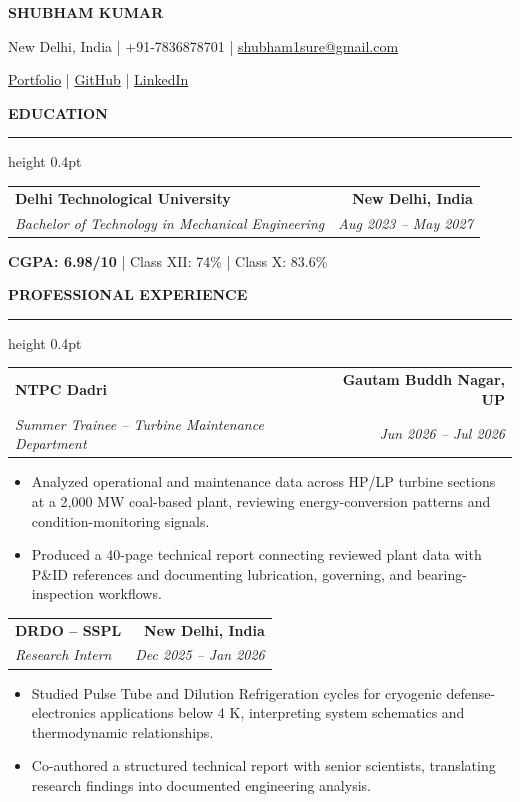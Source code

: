 \documentclass[10pt,a4paper]{article}
\makeatletter
\newcommand{\ressection}[1]{%
  \vspace{4.8pt}%
  {\fontsize{10.2}{11.2}\selectfont\bfseries\MakeUppercase{#1}}\par
  \vspace{2.3pt}\hrule height 0.4pt\vspace{3.6pt}%
}
\newcommand{\entryheading}[4]{%
  \begin{tabular*}{\textwidth}{@{\extracolsep{\fill}}lr}
    \textbf{#1} & \textbf{#2}\\
    \textit{#3} & \textit{#4}
  \end{tabular*}\par
}
\newenvironment{resbullets}{%
  \begin{itemize}[leftmargin=11pt,label=\textbullet,itemsep=0pt,topsep=1.2pt,parsep=0pt,partopsep=0pt]
  \fontsize{9.55}{10.95}\selectfont
}{\end{itemize}\vspace{1pt}}
\makeatother
\begin{document}
\fontsize{9.8}{11.2}\selectfont

\begin{center}
  {\fontsize{21.5}{23}\selectfont\bfseries SHUBHAM KUMAR}\par
  \vspace{1pt}
  New Delhi, India \quad | \quad +91-7836878701 \quad | \quad \href{mailto:shubham1sure@gmail.com}{shubham1sure@gmail.com}\par
  \vspace{1pt}
  \href{https://nothing0g.github.io/analyst/}{Portfolio} \quad | \quad
  \href{https://github.com/Nothing0g}{GitHub} \quad | \quad
  \href{https://www.linkedin.com/in/shubham-kumar-diff/}{LinkedIn}
\end{center}
\vspace{-3pt}

\ressection{Education}
\begin{tabular*}{\textwidth}{@{\extracolsep{\fill}}lr}
  \textbf{Delhi Technological University} & \textbf{New Delhi, India}\\
  \textit{Bachelor of Technology in Mechanical Engineering} & \textit{Aug 2023 -- May 2027}
\end{tabular*}\par
\textbf{CGPA: 6.98/10} \quad | \quad Class XII: 74\% \quad | \quad Class X: 83.6\%

\ressection{Professional Experience}
\entryheading{NTPC Dadri}{Gautam Buddh Nagar, UP}{Summer Trainee -- Turbine Maintenance Department}{Jun 2026 -- Jul 2026}
\begin{resbullets}
  \item Analyzed operational and maintenance data across HP/LP turbine sections at a 2,000 MW coal-based plant, reviewing energy-conversion patterns and condition-monitoring signals.
  \item Produced a 40-page technical report connecting reviewed plant data with P\&ID references and documenting lubrication, governing, and bearing-inspection workflows.
\end{resbullets}

\entryheading{DRDO -- SSPL}{New Delhi, India}{Research Intern}{Dec 2025 -- Jan 2026}
\begin{resbullets}
  \item Studied Pulse Tube and Dilution Refrigeration cycles for cryogenic defense-electronics applications below 4 K, interpreting system schematics and thermodynamic relationships.
  \item Co-authored a structured technical report with senior scientists, translating research findings into documented engineering analysis.
\end{resbullets}
\end{document}
